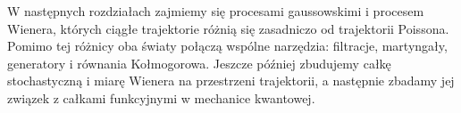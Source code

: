 W następnych rozdziałach zajmiemy się procesami gaussowskimi
i procesem Wienera, których ciągłe trajektorie różnią się
zasadniczo od trajektorii Poissona. Pomimo tej różnicy
oba światy połączą wspólne narzędzia: filtracje, martyngały,
generatory i równania Kołmogorowa. Jeszcze później
zbudujemy całkę stochastyczną i miarę Wienera na przestrzeni
trajektorii, a następnie zbadamy jej związek z całkami
funkcyjnymi w mechanice kwantowej.


